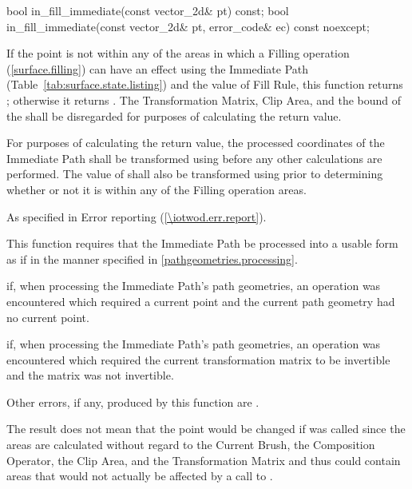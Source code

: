 \begin{itemdecl}
bool in_fill_immediate(const vector_2d& pt) const;
bool in_fill_immediate(const vector_2d& pt, error_code& ec) const noexcept;
\end{itemdecl}
\begin{itemdescr}
\pnum
\returns
If the point  is not within any of the areas in which a Filling operation (\ref{surface.filling}) can have an effect using the Immediate Path (Table~\ref{tab:surface.state.listing}) and the value of Fill Rule, this function returns ; otherwise it returns . The Transformation Matrix, Clip Area, and the bound of the \underlyingsurface shall be disregarded for purposes of calculating the return value.

\pnum
For purposes of calculating the return value, the processed coordinates of the Immediate Path shall be transformed using  before any other calculations are performed. The value of  shall also be transformed using  prior to determining whether or not it is within any of the Filling operation areas.

\pnum
\throws
As specified in Error reporting (\ref{\iotwod.err.report}).

\pnum
\remarks
This function requires that the Immediate Path be processed into a usable form as if in the manner specified in \ref{pathgeometries.processing}.

\pnum
\errors
{} if, when processing the Immediate Path's path geometries, an operation was encountered which required a current point and the current path geometry had no current point.

\pnum
{} if, when processing the Immediate Path's path geometries, an operation was encountered which required the current transformation matrix to be invertible and the matrix was not invertible.

\pnum
Other errors, if any, produced by this function are .

\pnum
\realnotes
The result does not mean that the point  would be changed if  was called since the areas are calculated without regard to the Current Brush, the Composition Operator, the Clip Area, and the Transformation Matrix and thus could contain areas that would not actually be affected by a call to .
\end{itemdescr}

